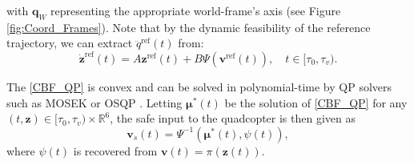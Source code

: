 \documentclass[journal,10pt]{IEEEtran}
\newcommand{\vect}[1]{\boldsymbol{\mathbf{#1}}}
\newcommand{\mat}[1]{\begin{bmatrix} #1 \end{bmatrix}}
\newif\ifdraft
\newcommand{\XX}[1]{\ifdraft{\color{red}[{\bf XX}: #1]}\fi}
\newcommand{\VF}[1]{\ifdraft{\color{blue}[{\bf VF}: #1]}\fi}
\begin{document}
with $\vect{q}_W$ representing the appropriate world-frame's axis (see Figure \ref{fig:Coord_Frames}). Note that by the dynamic feasibility of the reference trajectory, we can extract $\ddot{q}^{\text{ref}}(t)$ from:
\begin{equation}
    \dot{\vect{z}}^{\text{ref}}(t) = A\vect{z}^{\text{ref}}(t) + B\Psi(\vect{v}^{\text{ref}}(t)), \quad t\in[\tau_0,\tau_v). 
\end{equation}

The \eqref{CBF_QP} is convex and can be solved in polynomial-time by QP solvers such as MOSEK \cite{mosek} or OSQP \cite{osqp}. Letting $\vect{\mu}^*(t)$ be the solution of \eqref{CBF_QP} for any $(t,\vect{z})\in[\tau_0,\tau_v)\times\mathbb{R}^6$, the safe input to the quadcopter is then  given as 
\begin{equation}\label{safe_input}
    \vect{v}_s(t) = \Psi^{-1}(\vect{\mu}^*(t),\psi(t)),
\end{equation}
where $\psi(t)$ is recovered from $\vect{v}(t) = \pi(\vect{z}(t))$.%
\end{document}
